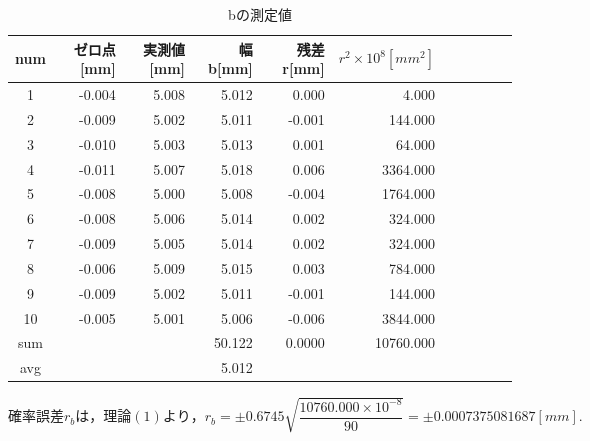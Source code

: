 \documentclass[a4paper,1pt]{jsarticle}
\begin{document}
\begin{table}[H]
  \caption{bの測定値}
  \label{table:SpeedOfLight}
  \centering
  \begin{tabular}{|c||r|r|r|r|r|r|r|r|r|r|}
    \hline
    num & ゼロ点[mm] & 実測値[mm] & 幅 b[mm] & 残差 r[mm] & $r^2\times10^8[mm^2]$  \\
    \hline\hline
    1 & -0.004 & 5.008 & 5.012  & 0.000  & 4.000 \\
    2 & -0.009 & 5.002 & 5.011  & -0.001  & 144.000 \\
    3 & -0.010 & 5.003 & 5.013  & 0.001  & 64.000 \\
    4 & -0.011 & 5.007 & 5.018  & 0.006  & 3364.000 \\
    5 & -0.008 & 5.000 & 5.008  & -0.004  & 1764.000 \\
    6 & -0.008 & 5.006 & 5.014  & 0.002  & 324.000 \\
    7 & -0.009 & 5.005 & 5.014  & 0.002  & 324.000 \\
    8 & -0.006 & 5.009 & 5.015  & 0.003  & 784.000 \\
    9 & -0.009 & 5.002 & 5.011  & -0.001  & 144.000 \\
    10 & -0.005 & 5.001 & 5.006  & -0.006  & 3844.000 \\
    
    \hline\hline
    sum &  &  & 50.122  & 0.0000 & 10760.000 \\
    \hline
    avg &  &  & 5.012 &  &  \\

    \hline
  \end{tabular}

\end{table}

$確率誤差r_bは，理論(1)より，r_b=\pm0.6745\sqrt{\dfrac{10760.000\times10^{-8}}{90}}=\pm0.0007375081687[mm].$
\end{document}
